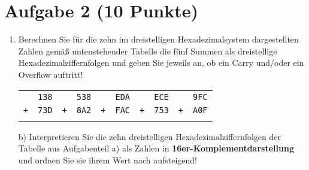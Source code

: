\section*{Aufgabe 2 (10 Punkte)}

\begin{enumerate}[label={a)}, leftmargin=*]
\item Berechnen Sie für die zehn im dreistelligen Hexadezimalsystem dargestellten Zahlen gemäß untenstehender Tabelle die fünf Summen als dreistellige Hexadezimalziffernfolgen und geben Sie jeweils an, ob ein Carry und/oder ein Overflow auftritt!

\begin{table}[h]
\centering
\begin{tabular}{|cc|cc|cc|cc|cc|}
& \texttt{138} & & \texttt{538} & & \texttt{EDA} & & \texttt{ECE} & & \texttt{9FC}\\
\texttt{+} & \texttt{73D} & \texttt{+} & \texttt{8A2} & \texttt{+} & \texttt{FAC} & \texttt{+} & \texttt{753} & \texttt{+} & \texttt{A0F}\\
\hline
& & & & & & & & &\\
\end{tabular}
\end{table}

\item[b)] Interpretieren Sie die zehn dreistelligen Hexadezimalziffernfolgen der Tabelle aus Aufgabenteil a) als Zahlen in \textbf{16er-Komplementdarstellung} und ordnen Sie sie ihrem Wert nach aufsteigend!
\end{enumerate}